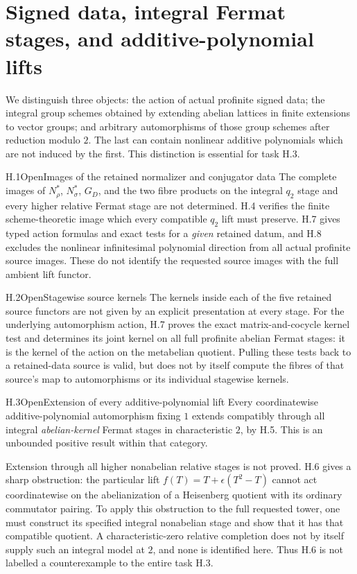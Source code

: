 \section{Signed data, integral Fermat stages, and additive-polynomial lifts}

We distinguish three objects: the action of actual profinite signed
data; the integral group schemes obtained by extending abelian
lattices in finite extensions to vector groups; and arbitrary
automorphisms of those group schemes after reduction modulo $2$.
The last can contain nonlinear additive polynomials which are not
induced by the first. This distinction is essential for task H.3.

\begin{statement}{H.1}{Open}{Images of the retained normalizer and conjugator data}
The complete images of $N_\rho^*$, $N_\sigma^*$, $G_D$, and the
two fibre products on the integral $q_2$ stage and every higher
relative Fermat stage are not determined. H.4 verifies the finite
scheme-theoretic image which every compatible $q_2$ lift must
preserve. H.7 gives typed action formulas and exact tests for a
\emph{given} retained datum, and H.8 excludes the nonlinear
infinitesimal polynomial direction from all actual profinite source
images. These do not identify the requested source images with the
full ambient lift functor.
\end{statement}

\begin{statement}{H.2}{Open}{Stagewise source kernels}
The kernels inside each of the five retained source functors are not
given by an explicit presentation at every stage. For the underlying
automorphism action, H.7 proves the exact matrix-and-cocycle kernel
test and determines its joint kernel on all full profinite abelian
Fermat stages: it is the kernel of the action on the metabelian
quotient. Pulling these tests back to a retained-data source is
valid, but does not by itself compute the fibres of that source's
map to automorphisms or its individual stagewise kernels.
\end{statement}

\begin{statement}{H.3}{Open}{Extension of every additive-polynomial lift}
Every coordinatewise additive-polynomial automorphism fixing $1$
extends compatibly through all integral \emph{abelian-kernel}
Fermat stages in characteristic $2$, by H.5. This is an unbounded
positive result within that category.

Extension through all higher nonabelian relative stages is not
proved. H.6 gives a sharp obstruction: the particular lift
$f(T)=T+\epsilon(T^2-T)$ cannot act coordinatewise on the
abelianization of a Heisenberg quotient with its ordinary
commutator pairing. To apply this obstruction to the full requested
tower, one must construct its specified integral nonabelian stage
and show that it has that compatible quotient. A characteristic-zero
relative completion does not by itself supply such an integral
model at $2$, and none is identified here. Thus H.6 is not labelled
a counterexample to the entire task H.3.
\end{statement}

